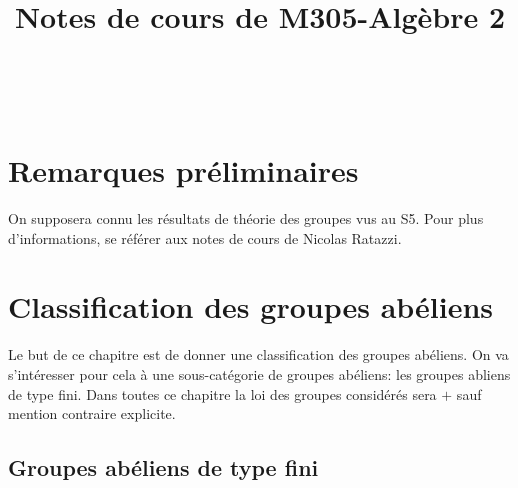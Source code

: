 \documentclass{report}
\theoremstyle{definition}
\theoremstyle{remark}
\begin{document}
\title{Notes de cours de M305-Alg\`ebre 2}

\makeatletter
\begin{titlepage}
    \vspace*{\fill}
    \begin{center}
      {\Huge \@title}\\[0.5cm]
      {\Large \@date}
    \end{center}
    \vspace*{\fill}
\end{titlepage}
\makeatother

\newpage

\tableofcontents

\newpage




\chapter*{Remarques pr\'eliminaires}

On supposera connu les r\'esultats de th\'eorie des groupes vus au S5. Pour plus d'informations, se r\'ef\'erer aux notes de cours de Nicolas Ratazzi.

\chapter{Classification des groupes ab\'eliens}

Le but de ce chapitre est de donner une classification des groupes ab\'eliens. On va s'int\'eresser pour cela \`a une sous-cat\'egorie de groupes ab\'eliens: les groupes abliens de type fini. Dans toutes ce chapitre la loi des groupes consid\'er\'es sera $+$ sauf mention contraire explicite.

\section{Groupes ab\'eliens de type fini}
\end{document}
